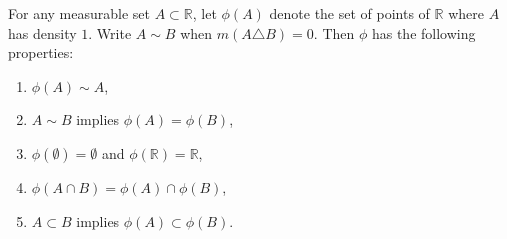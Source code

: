 \begin{theorem}[Theorem 3.21]
For any measurable set $A \subset \mathbb{R}$, let $\phi(A)$ denote the set of points of $\mathbb{R}$ where $A$ has density $1$. Write $A \sim B$ when $m(A \triangle B) = 0$. Then $\phi$ has the following properties:
\begin{enumerate}
\item[(1)] $\phi(A) \sim A$,
\item[(2)] $A \sim B$ implies $\phi(A) = \phi(B)$,
\item[(3)] $\phi(\emptyset) = \emptyset$ and $\phi(\mathbb{R}) = \mathbb{R}$,
\item[(4)] $\phi(A \cap B) = \phi(A) \cap \phi(B)$,
\item[(5)] $A \subset B$ implies $\phi(A) \subset \phi(B)$.
\end{enumerate}
\end{theorem}
